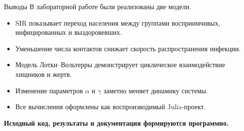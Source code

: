 \documentclass[
  10pt,
  ignorenonframetext,
  aspectratio=169,
  russian,
]{beamer}
\providecommand{\tightlist}{%
  \setlength{\itemsep}{0pt}\setlength{\parskip}{0pt}}
\begin{document}
\begin{frame}{Выводы}
\protect{}\label{ux432ux44bux432ux43eux434ux44b}
В лабораторной работе были реализованы две модели.

\begin{itemize}
\tightlist
\item
  SIR показывает переход населения между группами восприимчивых,
  инфицированных и выздоровевших.
\item
  Уменьшение числа контактов снижает скорость распространения инфекции.
\item
  Модель Лотки--Вольтерры демонстрирует циклическое взаимодействие
  хищников и жертв.
\item
  Изменение параметров \(\alpha\) и \(\gamma\) заметно меняет динамику
  системы.
\item
  Все вычисления оформлены как воспроизводимый Julia-проект.
\end{itemize}

\textbf{Исходный код, результаты и документация формируются программно.}
\end{frame}
\end{document}
